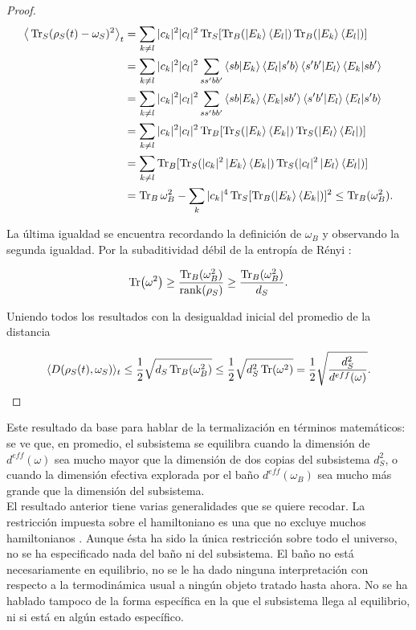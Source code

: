 \begin{proof}
\begin{align*}
\big \langle \Tr_{S}(\rho_{S}(t)-\omega_{S})^{2} \big \rangle_{t} &= \sum_{k \neq l} |c_{k}|^{2} |c_{l}|^{2} \Tr_{S} [\Tr_{B}(\ket{E_{k}} \bra{E_{l}}) \Tr_{B}(\ket{E_{k}} \bra{E_{l}})]\\
	&=\sum_{k \neq l} |c_{k}|^{2} |c_{l}|^{2} \sum_{ss' bb'} \bra{sb}\ket{E_{k}} \bra{E_{l}}\ket{s'b} \bra{s'b'}\ket{E_{l}} \bra{E_{k}}\ket{sb'}\\
	&=\sum_{k \neq l} |c_{k}|^{2} |c_{l}|^{2} \sum_{ss' bb'} \bra{sb}\ket{E_{k}} \bra{E_{k}}\ket{sb'} \bra{s'b'}\ket{E_{l}} \bra{E_{l}}\ket{s'b}\\
	&=\sum_{k \neq l} |c_{k}|^{2} |c_{l}|^{2} \Tr_{B} [\Tr_{S}(\ket{E_{k}} \bra{E_{k}}) \Tr_{S}(\ket{E_{l}} \bra{E_{l}})]\\
	&=\sum_{k \neq l}  \Tr_{B} [\Tr_{S}(|c_{k}|^{2}\ket{E_{k}} \bra{E_{k}}) \Tr_{S}( |c_{l}|^{2} \ket{E_{l}} \bra{E_{l}})]\\
&=\Tr_{B} \omega_{B}^{2} -\sum_{k} |c_{k}|^{4} \Tr_{S}[ \Tr_{B}( \ket{E_{k}} \bra{E_{k}})]^{2} \leq  \Tr_{B}( \omega_{B}^{2}).
\end{align*}

La última igualdad se encuentra recordando la definición de $\omega_{B}$ y observando la segunda igualdad. Por la subaditividad débil de la entropía de Rényi \cite{RenyiEntropia}:

\begin{equation}
\Tr(\omega^{2}) \geq  \frac{\Tr_{B}(\omega_{B}^{2})}{ \rank (\rho_{S})} \geq \frac{\Tr_{B}(\omega_{B}^{2})}{d_{S}}.
\end{equation}

Uniendo todos los resultados con la desigualdad inicial del promedio de la distancia

\begin{equation}
\langle D(\rho_{S}(t) ,\omega_{S}) \rangle_{t} \le  \frac{1}{2} \sqrt{d_{S} \Tr_{B}(\omega_{B}^{2})} \le \frac{1}{2}\sqrt{d_{S}^{2} 	\Tr(\omega^{2})}=\frac{1}{2}\sqrt{\frac{d_{S}^{2}}{d^{eff}(\omega)}}.
\end{equation}
\end{proof}
Este resultado da base para hablar de la termalización en términos matemáticos: se ve que, en promedio, el subsistema se equilibra cuando la dimensión de $d^{eff}(\omega)$ sea mucho mayor que la dimensión de dos copias del subsistema $d_{S}^{2}$, o cuando la dimensión efectiva explorada por el baño $d^{eff}(\omega_{B})$ sea mucho más grande que la dimensión del subsistema.
\\
El resultado anterior tiene varias generalidades que se quiere recodar. La restricción impuesta sobre el hamiltoniano  es una que no excluye muchos hamiltonianos \cite{SakuraiQuantum}. Aunque ésta ha sido la única restricción sobre todo el universo, no se ha especificado nada del baño ni del subsistema. El baño no está necesariamente en equilibrio, no se le ha dado ninguna interpretación con respecto a la termodinámica usual a ningún objeto tratado hasta ahora. No se ha hablado tampoco de la forma específica en la que el subsistema llega al equilibrio, ni si está en algún estado específico.
